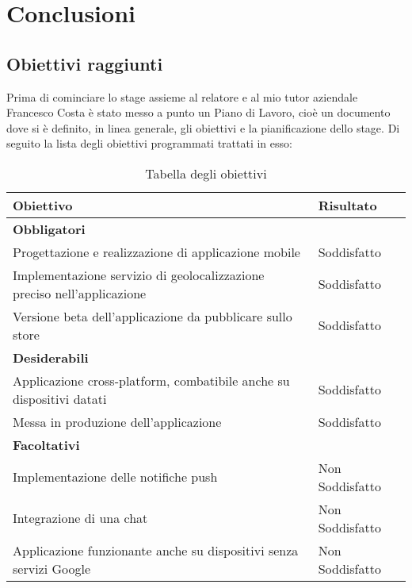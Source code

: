 
\chapter{Conclusioni}
\label{cap:valutazione-retrospettiva}


\section{Obiettivi raggiunti}

Prima di cominciare lo stage assieme al relatore \myProf e al mio tutor aziendale Francesco Costa è stato messo a punto
un Piano di Lavoro, cioè un documento dove si è definito, in linea generale, gli obiettivi e la pianificazione dello
stage. Di seguito la lista degli obiettivi programmati trattati in esso: 

\renewcommand{\arraystretch}{2}
\begin{longtable}{|p{10cm}|p{4cm}|}%
  \caption{Tabella degli obiettivi} 
  \label{tab:obiettivi} \\
    \hline
    \textbf{Obiettivo} & \textbf{Risultato} \\
    \hline
    \endhead
    \multicolumn{2}{|l|}{\textbf{Obbligatori}} \\ \hline
    Progettazione e realizzazione di applicazione mobile                      & Soddisfatto \\ \hline
    Implementazione servizio di geolocalizzazione preciso nell’applicazione   & Soddisfatto \\ \hline
    Versione beta dell'applicazione da pubblicare sullo store                 & Soddisfatto \\ \hline
    \multicolumn{2}{|l|}{\textbf{Desiderabili}} \\ \hline
    Applicazione cross-platform, combatibile anche su dispositivi datati      & Soddisfatto \\ \hline
    Messa in produzione dell’applicazione                                     & Soddisfatto \\ \hline
    \multicolumn{2}{|l|}{\textbf{Facoltativi}} \\ \hline
    Implementazione delle notifiche push                                      & Non Soddisfatto \\ \hline
    Integrazione di una chat                                                  & Non Soddisfatto \\ \hline
    Applicazione funzionante anche su dispositivi senza servizi Google        & Non Soddisfatto \\ \hline
\end{longtable}%

